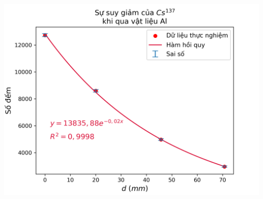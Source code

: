 \documentclass{article}
\begin{document}
\begin{center}
  {\includegraphics[width=\textwidth]{al}}
\end{center}
\vspace{0.5cm}
\end{document}
